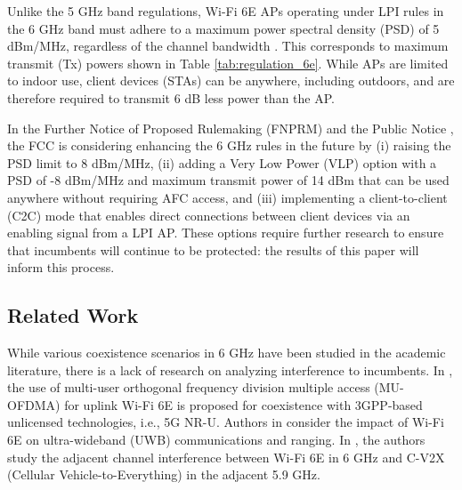 \documentclass[sigconf,10pt]{acmart}
\begin{document}
Unlike the 5 GHz band regulations, Wi-Fi 6E APs operating under LPI rules in the 6 GHz band must adhere to a maximum power spectral density (PSD) of 5 dBm/MHz, regardless of the channel bandwidth \cite{vanlin1}. 
This corresponds to maximum transmit (Tx) powers shown in Table \ref{tab:regulation_6e}. While APs are limited to indoor use, client devices (STAs) can be anywhere, including outdoors, and are therefore required to transmit 6 dB less power than the AP.

In the Further Notice of Proposed Rulemaking (FNPRM) \cite{FCC1} and the Public Notice \cite{PN}, the FCC is considering enhancing the 6 GHz rules in the future by (i) raising the PSD limit to 8 dBm/MHz, (ii) adding a Very Low Power (VLP) option with a PSD of -8 dBm/MHz and maximum transmit power of 14 dBm that can be used anywhere without requiring AFC access, and (iii) implementing a client-to-client (C2C) mode that enables direct connections between client devices via an enabling signal from a LPI AP. These options require further research to ensure that incumbents will continue to be protected: the results of this paper will inform this process.

\vspace{-.2em}

\subsection{Related Work}

While various coexistence scenarios in 6 GHz have been studied in the academic literature, there is a lack of research on analyzing interference to incumbents. In \cite{9488780}, the use of multi-user orthogonal frequency division multiple access (MU-OFDMA) for uplink Wi-Fi 6E is proposed for coexistence with 3GPP-based unlicensed technologies, i.e., 5G NR-U. 
Authors in \cite{9826115}  consider the impact of Wi-Fi 6E on ultra-wideband (UWB) communications and ranging.
In \cite{9722698}, the authors study the adjacent channel interference between Wi-Fi 6E in 6 GHz and C-V2X (Cellular Vehicle-to-Everything) in the adjacent 5.9 GHz.
\end{document}
